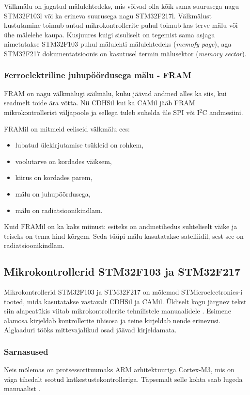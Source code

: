 \documentclass[12pt,a4paper]{article}
\newcommand{\iic}{I${}^2$C }
\begin{document}
Välkmälu on jagatud mälulehtedeks, mis võivad olla kõik sama suurusega nagu
STM32F103l või ka erineva suurusega nagu STM32F217l. Välkmälust kustutamine
toimub antud mikrokontrollerite puhul toimub kas terve mälu või ühe mälelehe
kaupa. Kusjuures kuigi sisuliselt on tegemist sama asjaga nimetatakse STM32F103
puhul mälulehti mälulehtedeks (\textit{memofy page}), aga STM32F217
dokumentatsioonis on kasutusel termin mälusektor (\textit{memory sector}).
\cite{f1fpm,f2fpm}

\subsubsection{Ferroelektriline juhupöördusega mälu - FRAM}
FRAM on nagu välkmälugi säilmälu, kuhu jäävad andmed alles ka siis, kui seadmelt
toide ära võtta. Nii CDHSil kui ka CAMil jääb FRAM mikrokontrollerist väljapoole
ja sellega tuleb suhelda üle SPI või \iic andmesiini.

FRAMil on mitmeid eeliseid välkmälu ees:
\begin{itemize}
	\item lubatud ülekirjutamise tsükleid on rohkem,
	\item voolutarve on kordades väiksem,
	\item kiirus on kordades parem,
	\item mälu on juhupöördusega,
	\item mälu on radiatsioonikindlam.
\end{itemize}
Kuid FRAMil on ka kaks miinust: esiteks on andmetihedus suhteliselt väike ja teiseks
on tema hind kõrgem. Seda tüüpi mälu kasutatakse satelliidil, sest see on
radiatsioonikindlam. \cite{fram}

\subsection{Mikrokontrollerid STM32F103 ja STM32F217}
\label{sec:mcu}
Mikrokontrollerid STM32F103 ja STM32F217 on mõlemad STMicroelectronics-i tooted,
mida kasutatakse vastavalt CDHSil ja CAMil. Üldiselt kogu järgnev tekst siin
alapeatükis viitab mikrokontrollerite tehnilistele manuaalidele
\cite{f1rm,f2rm}. Esimene alamosa kirjeldab kontrollerite ühisosa ja teine
kirjeldab nende erinevusi. Alglaaduri tööks mittevajalikud osad jäävad
kirjeldamata.
\subsubsection{Sarnasused}
\label{sec:mcu:same}
Neis mõlemas on protsessorituumaks ARM arhitektuuriga Cortex-M3, mis on väga
tihedalt seotud katkestustekontrolleriga. Täpsemalt selle kohta saab lugeda
manuaalist \cite{CM3pm}.
\end{document}
